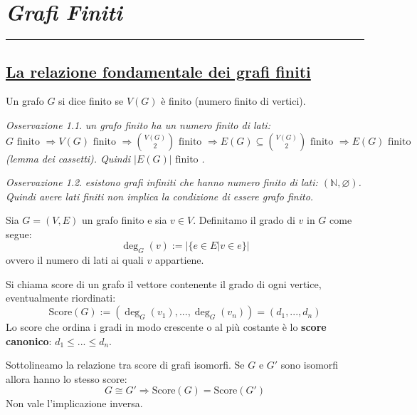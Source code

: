 \documentclass[oneside]{book}
\theoremstyle{remark}
\newtheorem*{osservaz}{Osservazione}
\newcommand{\chptr}[1]{\chapter{\textit{#1}}\noindent\rule{\textwidth}{1pt}}
\newcommand{\teorema}[1]{\section{\underline{#1}}}
\begin{document}
\chptr{Grafi Finiti}
\teorema{La relazione fondamentale dei grafi finiti}
\begin{tcolorbox}[colback=yellow!30, colframe=yellow!30!black, title=Grafo finito]
Un grafo $G$ si dice finito se $V(G)$ è finito (numero finito di vertici).
\end{tcolorbox}

\begin{osservaz}
\emph{un grafo finito ha un numero finito di lati:
$G \text{ finito } \Longrightarrow V(G) \text{ finito }
\Longrightarrow \binom{V(G)}{2} \text{ finito } \Longrightarrow E(G) \subseteq
\binom{V(G)}{2} \text{ finito } \Longrightarrow E(G) \text{ finito}$ (lemma dei cassetti).
Quindi $|E(G)| \text{ finito }$.}
\end{osservaz}

\begin{osservaz}
\emph{esistono grafi infiniti che hanno numero finito di
lati: $(\mathbb{N}, \varnothing)$. Quindi avere lati finiti non implica la
condizione di essere grafo finito.}
\end{osservaz}

\begin{tcolorbox}[colback=yellow!30, colframe=yellow!30!black, title=Grado di un vertice]
Sia $G=(V,E)$ un grafo finito e sia $v \in V$. Definitamo il grado di $v$
in $G$ come segue:
\[  \deg_G(v) := |\{e \in E| v \in e\}| \]
ovvero il numero di lati ai quali $v$ appartiene.
\end{tcolorbox}

\begin{tcolorbox}[colback=yellow!30, colframe=yellow!30!black, title=Score di un grafo]
Si chiama score di un grafo il vettore contenente il grado di ogni vertice,
eventualmente riordinati:
\[ \text{Score}(G) := (\deg_G(v_1),...,\deg_G(v_n)) = (d_1,...,d_n) \]
Lo score che ordina i gradi in modo crescente o al più costante è lo \textbf{score canonico}:
$d_1\leq ...\leq d_n$.
\end{tcolorbox}
Sottolineamo la relazione tra score di grafi isomorfi. Se $G$ e $G'$ sono isomorfi allora hanno lo stesso score:
\[ G \cong G' \Longrightarrow \text{Score}(G) = \text{Score}(G') \]
Non vale l'implicazione inversa.
\end{document}
